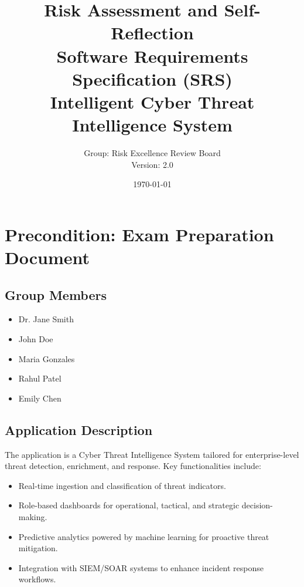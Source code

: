 \documentclass[12pt]{article}
\title{Risk Assessment and Self-Reflection \\ \vspace{1em} \Large Software Requirements Specification (SRS) \\ Intelligent Cyber Threat Intelligence System}
\author{Group: Risk Excellence Review Board \\ Version: 2.0}
\date{\today}
\begin{document}
\maketitle
\thispagestyle{empty}

\newpage
\tableofcontents
\newpage

\section{Precondition: Exam Preparation Document}
\subsection{Group Members}
\begin{itemize}
    \item Dr. Jane Smith
    \item John Doe
    \item Maria Gonzales
    \item Rahul Patel
    \item Emily Chen
\end{itemize}

\subsection{Application Description}
The application is a Cyber Threat Intelligence System tailored for enterprise-level threat detection, enrichment, and response. Key functionalities include:
\begin{itemize}
    \item Real-time ingestion and classification of threat indicators.
    \item Role-based dashboards for operational, tactical, and strategic decision-making.
    \item Predictive analytics powered by machine learning for proactive threat mitigation.
    \item Integration with SIEM/SOAR systems to enhance incident response workflows.
\end{itemize}
\end{document}
